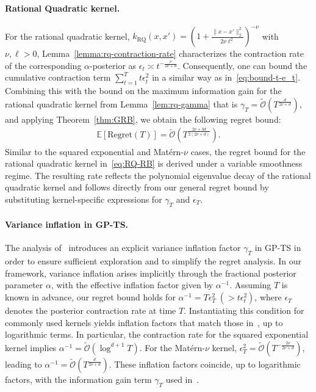 \documentclass[final,12pt]{colt2026} %
\begin{document}
\paragraph{Rational Quadratic kernel.} 
For the rational quadratic kernel,
\(
k_{\mathrm{RQ}}(x,x')
=
\left(1 + \frac{\|x-x'\|_2^2}{2\nu \ell^2}\right)^{-\nu}
\)
with $\nu, \ell > 0$,
Lemma~\ref{lemma:rq-contraction-rate} characterizes the contraction rate of the corresponding $\alpha$-posterior as $\epsilon_t \asymp  t^{-\frac{\nu}{2\nu+d}}$. Consequently, one can bound the cumulative contraction term $\sum_{t=1}^{T} t \epsilon_t^2$ in a similar way as in~\eqref{eq:bound-t-e_t}. 
Combining this with the bound on the maximum information gain for the rational quadratic kernel from Lemma~\ref{lem:rq-gamma} that is \(\gamma_T
=
\mathcal{\tilde O} (T^{\frac{d}{2\nu+d}})\), and applying Theorem~\ref{thm:GRB}, we obtain the following regret bound:
\begin{align}\label{eq:RQ-RB}
\mathbb{E}[\mathrm{Regret}(T)]
=
\mathcal{\tilde O}\!\left(
T^{\frac{2\nu+3d}{2(2\nu+d)}}
\right).
\end{align}
Similar to the squared exponential and Mat\'ern-$\nu$ cases, the regret bound for the rational quadratic kernel in~\eqref{eq:RQ-RB} is derived under a variable smoothness regime. The resulting rate reflects the polynomial eigenvalue decay of the rational quadratic kernel and follows directly from our general regret bound by substituting kernel-specific expressions for $\gamma_T$ and $\epsilon_T$.

\paragraph{Variance inflation in GP-TS.} The analysis of~\cite{Ray&Gopalan2017} introduces an explicit variance inflation factor $\gamma_T$ in GP-TS in order to ensure sufficient exploration and to simplify the regret analysis. In our framework, variance inflation arises implicitly through the fractional posterior parameter $\alpha$, with the effective inflation factor given by $\alpha^{-1}$. Assuming $T$ is known in advance, our regret bound holds for  $\alpha^{-1}= T\epsilon_T^2\; (> t\epsilon_t^2)$, where $\epsilon_T$ denotes the posterior contraction rate at time $T$. Instantiating this condition for commonly used kernels yields inflation factors that match those in~\cite{Ray&Gopalan2017}, up to logarithmic terms. In particular, the contraction rate for the squared exponential kernel implies $\alpha^{-1} = \mathcal{\tilde{O}}(\log^{d+1} T)$. For the Mat\'ern-$\nu$ kernel, $\epsilon_T^2 = \mathcal{\tilde{O}}(T^{-\frac{2\nu}{2\nu+d}})$, leading to $\alpha^{-1} = \mathcal{\tilde{O}}(T^{\frac{d}{2\nu+d}})$. These inflation factors coincide, up to logarithmic factors, with the information gain term $\gamma_T$ used in~\cite{Ray&Gopalan2017}. 
\end{document}
